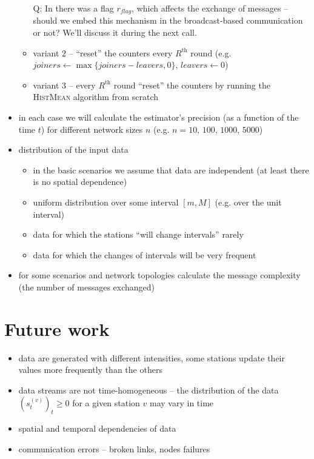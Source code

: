 \documentclass[a4paper, 12pt]{article}
\begin{document}
\begin{itemize}
\begin{itemize}
				Q: In \cite{Nugroho:2020:AveragingTS} there was a flag $r_{flag}$, which affects the exchange of messages -- should we embed this mechanism in the
				broadcast-based communication or not? We'll discuss it during the next call.
			\item variant $2$ -- ``reset'' the counters every $R^{\text{th}}$ round (e.g. $joiners \gets \max\{joiners - leavers,0\}$, $leavers \gets 0$)
			\item variant $3$ -- every $R^{\text{th}}$ round ``reset'' the counters by running the \textsc{HistMean} algorithm from scratch
		\end{itemize}
	\item in each case we will calculate the estimator's precision (as a function of the time $t$) for different network sizes $n$ (e.g. $n = 10,\,100,\,1000,\,5000$)
	\item distribution of the input data
		\begin{itemize}
			\item in the basic scenarios we assume that data are independent (at least there is no spatial dependence)
			\item uniform distribution over some interval $[m, M]$ (e.g. over the unit interval)
			\item data for which the stations ``will change intervals'' rarely
			\item data for which the changes of intervals will be very frequent
		\end{itemize}
	\item for some scenarios and network topologies calculate the message complexity (the number of messages exchanged)
\end{itemize}

\section*{Future work}
\begin{itemize}
	\item data are generated with different intensities, some stations update their values more frequently than the others
	\item data streams are not time-homogeneous -- the distribution of the data $(s^{(v)}_t)_t \geq 0$ for a given station $v$ may vary in time
	\item spatial and temporal dependencies of data
	\item communication errors -- broken links, nodes failures
\end{itemize}



\end{document}
